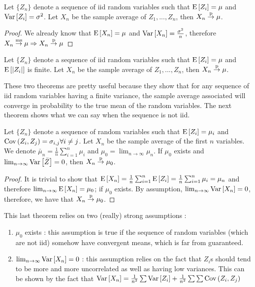 \begin{theorem}
Let $\{Z_n\}$ denote a sequence of iid random variables such that $\operatorname{E}\left[Z_i\right] = \mu$ and $\operatorname{Var}\left[Z_i\right] = \sigma^2$. Let $X_n$ be the sample average of $Z_1, ..., Z_n$, then $X_n \overset{\text{p}}{\to} \mu$.
\end{theorem}
\begin{proof}
We already know that $\operatorname{E}\left[X_n\right] = \mu$ and $\operatorname{Var}\left[X_n\right] = \frac{\sigma^2}{n}$, therefore $X_n \overset{\text{ms}}{\to} \mu \Rightarrow X_n \overset{\text{p}}{\to} \mu$
\end{proof}

\begin{theorem}
Let $\{Z_n\}$ denote a sequence of iid random variables such that $\operatorname{E}\left[Z_i\right] = \mu$ and $\operatorname{E}\left[\lvert Z_i \rvert\right]$ is finite. Let $X_n$ be the sample average of $Z_1, ..., Z_n$, then $X_n \overset{\text{p}}{\to} \mu$.
\end{theorem}

These two theorems are pretty useful because they show that for any sequence of iid random variables having a finite variance, the sample average associated will converge in probability to the true mean of the random variables. The next theorem shows what we can say when the sequence is not iid.

\begin{theorem}
Let $\{Z_n\}$ denote a sequence of random variables such that $\operatorname{E}\left[Z_i\right] = \mu_i$ and $\operatorname{Cov}\left(Z_i, Z_j\right) = \sigma_{i,j} \forall i\neq j$. Let $X_n$ be the sample average of the first $n$ variables. We denote $\bar\mu_n = \frac{1}{n} \sum_{i=1}^{n} \mu_i$ and $\mu_0 = \lim_{n\to\infty} \mu_n$. If $\mu_0$ exists and $\lim_{n\to\infty} \operatorname{Var}\left[\bar Z\right] = 0$, then $X_n\overset{\text{p}}{\to} \mu_0$.
\end{theorem}

\begin{proof}
It is trivial to show that $\operatorname{E}\left[X_n\right] = \frac{1}{n} \sum_{i=1}^{n} \operatorname{E}\left[Z_i\right] = \frac{1}{n} \sum_{i=1}^{n} \mu_i = \mu_n$ and therefore $\lim_{n\to\infty} \operatorname{E}\left[X_n\right] = \mu_0$; if $\mu_0$ exists. By assumption, $\lim_{n\to\infty} \operatorname{Var}\left[X_n\right] = 0$, therefore, we have that $X_n \overset{\text{p}}{\to} \mu_0$.
\end{proof}

This last theorem relies on two (really) strong assumptions :\begin{enumerate}
\item $\mu_0$ exists : this assumption is true if the sequence of random variables (which are not iid) somehow have convergent means, which is far from guaranteed.
\item $\lim_{n\to\infty} \operatorname{Var}\left[X_n\right] = 0$ : this assumption relies on the fact that $Z_i$s should tend to be more and more uncorrelated as well as having low variances. This can be shown by the fact that $\operatorname{Var}\left[X_n\right] = \frac{1}{n^2} \sum \operatorname{Var}\left[Z_i\right] +  \frac{1}{n^2} \sum \sum \operatorname{Cov}\left(Z_i, Z_j\right)$
\end{enumerate}

